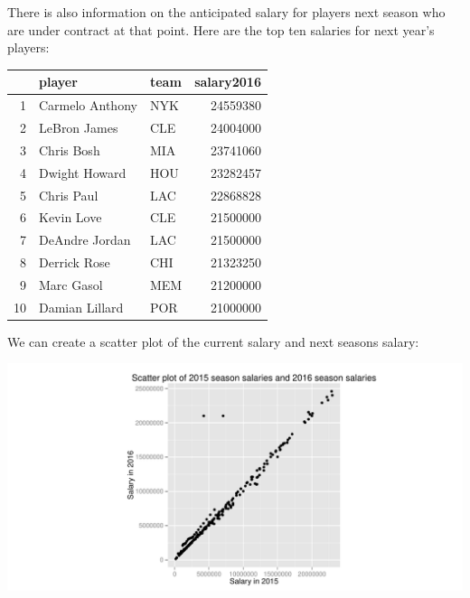 \documentclass[11pt]{article}\usepackage[]{graphicx}\usepackage[]{color}
\makeatletter
\def\maxwidth{ %
  \ifdim\Gin@nat@width>\linewidth
    \linewidth
  \else
    \Gin@nat@width
  \fi
}
\newenvironment{knitrout}{}{} %
\makeatother
\begin{document}
There is also information on the anticipated salary for players next season who are under contract at that point. Here are the top ten salaries for next year's players: \\
\begin{table}[ht]
\centering
\begin{tabular}{rllr}
  \hline
 & player & team & salary2016 \\ 
  \hline
1 & Carmelo Anthony & NYK & 24559380 \\ 
  2 & LeBron James & CLE & 24004000 \\ 
  3 & Chris Bosh & MIA & 23741060 \\ 
  4 & Dwight Howard & HOU & 23282457 \\ 
  5 & Chris Paul & LAC & 22868828 \\ 
  6 & Kevin Love & CLE & 21500000 \\ 
  7 & DeAndre Jordan & LAC & 21500000 \\ 
  8 & Derrick Rose & CHI & 21323250 \\ 
  9 & Marc Gasol & MEM & 21200000 \\ 
  10 & Damian Lillard & POR & 21000000 \\ 
   \hline
\end{tabular}
\end{table}

We can create a scatter plot of the current salary and next seasons salary:

\begin{knitrout}
\color{fgcolor}
\includegraphics[width=\maxwidth]{figure/unnamed-chunk-9-1} 

\end{knitrout}
\end{document}
